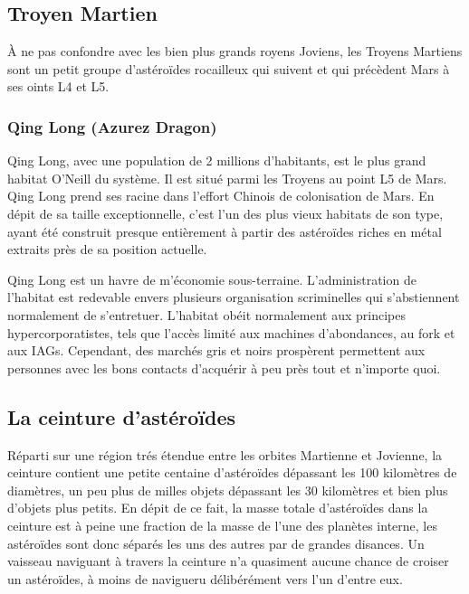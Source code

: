 \subsection{Troyen Martien} \label{sec:martian-trojans} 

À ne pas confondre avec les bien plus grands royens Joviens, les Troyens Martiens sont un petit groupe d'astéroïdes rocailleux qui suivent et qui précèdent Mars à ses oints L4 et L5. 

\subsubsection{Qing Long (Azurez Dragon)} \label{sec:qing-long-azurez} 

Qing Long, avec une population de 2 millions d'habitants, est le plus grand habitat O'Neill du système. Il est situé parmi les Troyens au point L5 de Mars. Qing Long prend ses racine dans l'effort Chinois de colonisation de Mars. En dépit de sa taille exceptionnelle, c'est l'un des plus vieux habitats de son type, ayant été construit presque entièrement à partir des astéroïdes riches en métal extraits près de sa position actuelle. 

Qing Long est un havre de m'économie sous-terraine. L'administration de l'habitat est redevable envers plusieurs organisation scriminelles qui s'abstiennent normalement de s'entretuer. L'habitat obéit normalement aux principes hypercorporatistes, tels que l'accès limité aux machines d'abondances, au fork et aux IAGs. Cependant, des marchés gris et noirs prospèrent permettent aux personnes avec les bons contacts d'acquérir à peu près tout et n'importe quoi. 

\subsection{La ceinture d'astéroïdes} \label{sec:asteroid-belt} 

Réparti sur une région trés étendue entre les orbites Martienne et Jovienne, la ceinture contient une petite centaine d'astéroïdes dépassant les 100 kilomètres de diamètres, un peu plus de milles objets dépassant les 30 kilomètres et bien plus d'objets plus petits. En dépit de ce fait, la masse totale d'astéroïdes dans la ceinture est à peine une fraction de la masse de l'une des planètes interne, les astéroïdes sont donc séparés les uns des autres par de grandes disances. Un vaisseau naviguant à travers la ceinture n'a quasiment aucune chance de croiser un astéroïdes, à moins de navigueru délibérément vers l'un d'entre eux. 

